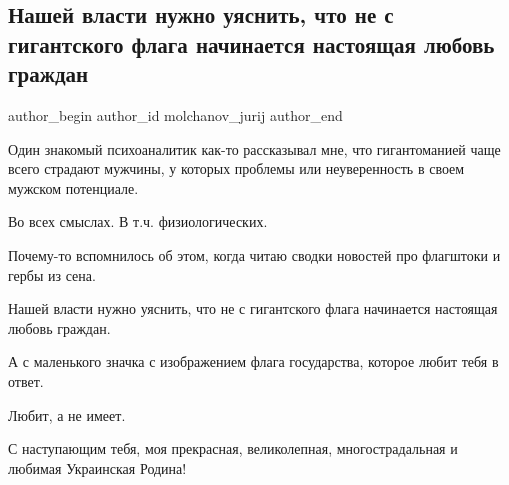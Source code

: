 
 
 
 
 
 
\subsection{Нашей власти нужно уяснить, что не с гигантского флага начинается настоящая любовь граждан}
\label{sec:23_08_2021.fb.molchanov_jurij.1.nezalezhnist_vlast_rodina}
 
\ifcmt
 author_begin
   author_id molchanov_jurij
 author_end
\fi

Один знакомый психоаналитик как-то рассказывал мне, что гигантоманией чаще
всего страдают мужчины, у которых проблемы или неуверенность в своем мужском
потенциале.

Во всех смыслах. В т.ч. физиологических.

Почему-то вспомнилось об этом, когда читаю сводки новостей про флагштоки и
гербы из сена.

Нашей власти нужно уяснить, что не с гигантского флага начинается настоящая
любовь граждан.

А с маленького значка с изображением флага государства, которое любит тебя в
ответ. 

Любит, а не имеет.

С наступающим тебя, моя прекрасная, великолепная, многострадальная и любимая
Украинская Родина!
